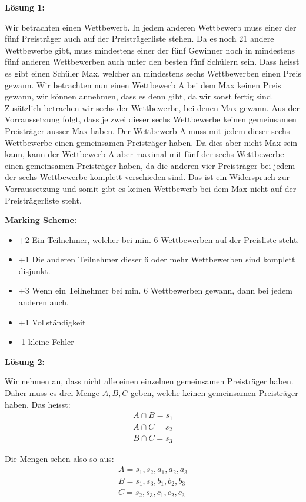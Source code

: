 \documentclass[language=german,style=solution]{smo}
\begin{document}
\begin{enumerate}
\textbf{Lösung 1:}

Wir betrachten einen Wettbewerb. In jedem anderen Wettbewerb muss einer der fünf Preisträger auch auf der Preisträgerliste stehen. Da es noch 21 andere Wettbewerbe gibt, muss mindestens einer der fünf Gewinner noch in mindestens fünf anderen Wettbewerben auch unter den besten fünf Schülern sein. Dass heisst es gibt einen Schüler Max, welcher an mindestens sechs Wettbewerben einen Preis gewann. 
Wir betrachten nun einen Wettbewerb A bei dem Max keinen Preis gewann, wir können annehmen, dass es denn gibt, da wir sonst fertig sind. Zusätzlich betrachen wir sechs der Wettbewerbe, bei denen Max gewann. Aus der Vorraussetzung folgt, dass je zwei dieser sechs Wettbewerbe keinen gemeinsamen Preisträger ausser Max haben. Der Wettbewerb A muss mit jedem dieser sechs Wettbewerbe einen gemeinsamen Preisträger haben. Da dies aber nicht Max sein kann, kann der Wettbewerb A aber maximal mit fünf der sechs Wettbewerbe einen gemeinsamen Preisträger haben, da die anderen vier Preisträger bei jedem der sechs Wettbewerbe komplett verschieden sind. Das ist ein Widerspruch zur Vorraussetzung und somit gibt es keinen Wettbewerb bei dem Max nicht auf der Preisträgerliste steht.

\textbf{Marking Scheme:}
\begin{itemize}
\item +2 Ein Teilnehmer, welcher bei min. 6 Wettbewerben auf der Preisliste steht.
\item +1 Die anderen Teilnehmer dieser 6 oder mehr Wettbewerben sind komplett disjunkt.
\item +3 Wenn ein Teilnehmer bei min. 6 Wettbewerben gewann, dann bei jedem anderen auch.
\item +1 Vollständigkeit
\item -1 kleine Fehler
\end{itemize}

\newpage
\textbf{Lösung 2:}

Wir nehmen an, dass nicht alle einen einzelnen gemeinsamen Preisträger haben. Daher muss es drei Menge $A,B,C$ geben, welche keinen gemeinsamen Preisträger haben. Das heisst:
\begin{gather*}
A\cap B={s_1}\\
A\cap C={s_2}\\
B\cap C={s_3}
\end{gather*}

Die Mengen sehen also so aus:
\begin{gather*}
A={s_1,s_2,a_1,a_2,a_3}\\
B={s_1,s_3,b_1,b_2,b_3}\\
C={s_2,s_3,c_1,c_2,c_3}
\end{gather*}


\end{enumerate}
\end{document}
